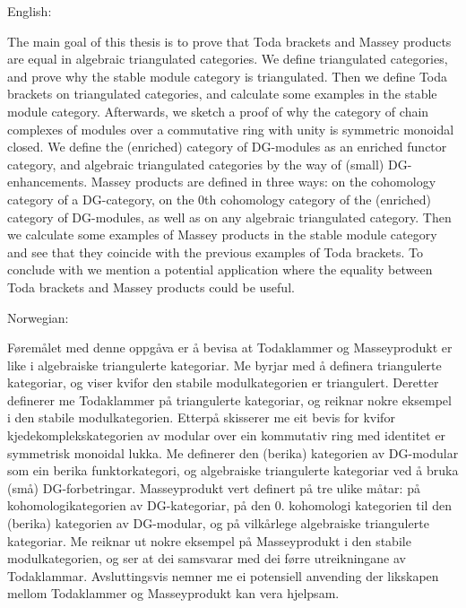 English:

The main goal of this thesis is to prove that Toda brackets and Massey products are equal in algebraic triangulated categories. We define triangulated categories, and prove why the stable module category is triangulated. Then we define Toda brackets on triangulated categories, and calculate some examples in the stable module category. Afterwards, we sketch a proof of why the category of chain complexes of modules over a commutative ring with unity is symmetric monoidal closed. We define the (enriched) category of DG-modules as an enriched functor category, and algebraic triangulated categories by the way of (small) DG-enhancements. Massey products are defined in three ways: on the cohomology category of a DG-category, on the 0th cohomology category of the (enriched) category of DG-modules, as well as on any algebraic triangulated category. Then we calculate some examples of Massey products in the stable module category and see that they coincide with the previous examples of Toda brackets. To conclude with we mention a potential application where the equality between Toda brackets and Massey products could be useful.

Norwegian:

Føremålet med denne oppgåva er å bevisa at Todaklammer og Masseyprodukt er like i algebraiske triangulerte kategoriar. Me byrjar med å definera triangulerte kategoriar, og viser kvifor den stabile modulkategorien er triangulert. Deretter definerer me Todaklammer på triangulerte kategoriar, og reiknar nokre eksempel i den stabile modulkategorien. Etterpå skisserer me eit bevis for kvifor kjedekomplekskategorien av modular over ein kommutativ ring med identitet er symmetrisk monoidal lukka. Me definerer den (berika) kategorien av DG-modular som ein berika funktorkategori, og algebraiske triangulerte kategoriar ved å bruka (små) DG-forbetringar. Masseyprodukt vert definert på tre ulike måtar: på kohomologikategorien av DG-kategoriar, på den 0. kohomologi kategorien til den (berika) kategorien av DG-modular, og på vilkårlege algebraiske triangulerte kategoriar. Me reiknar ut nokre eksempel på Masseyprodukt i den stabile modulkategorien, og ser at dei samsvarar med dei førre utreikningane av Todaklammar. Avsluttingsvis nemner me ei potensiell anvending der likskapen mellom Todaklammer og Masseyprodukt kan vera hjelpsam.